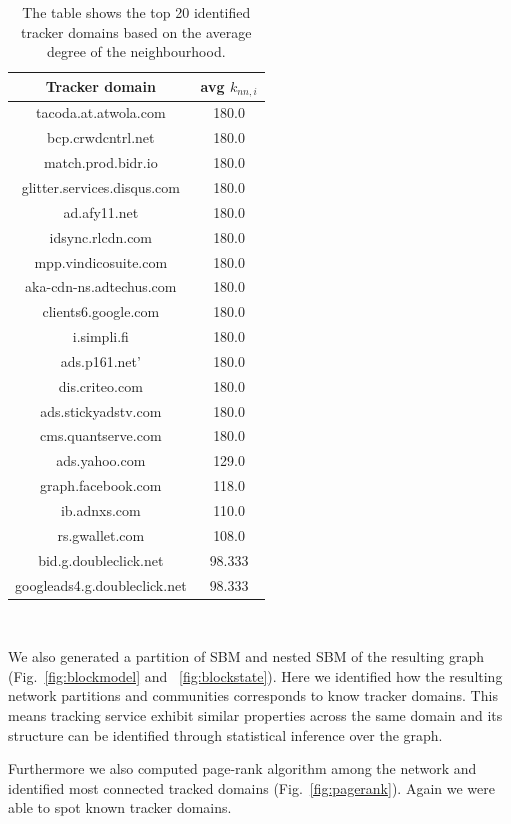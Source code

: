 \begin{table}[h!]
\centering
\begin{tabular}{ || c | c || }
\hline
Tracker domain & avg $k_{nn,i}$ \\
\hline
\hline
tacoda.at.atwola.com & 180.0 \\
bcp.crwdcntrl.net & 180.0 \\
match.prod.bidr.io & 180.0 \\
glitter.services.disqus.com & 180.0 \\
ad.afy11.net & 180.0 \\
idsync.rlcdn.com &180.0 \\
mpp.vindicosuite.com & 180.0 \\
aka-cdn-ns.adtechus.com & 180.0 \\
clients6.google.com & 180.0 \\
i.simpli.fi & 180.0 \\
ads.p161.net' & 180.0 \\
dis.criteo.com & 180.0 \\
ads.stickyadstv.com & 180.0 \\
cms.quantserve.com & 180.0 \\
ads.yahoo.com & 129.0 \\
graph.facebook.com & 118.0 \\
ib.adnxs.com & 110.0 \\
rs.gwallet.com & 108.0 \\
bid.g.doubleclick.net & 98.333\\
googleads4.g.doubleclick.net & 98.333\\
\hline
\end{tabular}
\\[2.5pt]
\caption{\label{table:trackers} The table shows the top 20 identified tracker domains based on the average degree of the neighbourhood.}
\end{table}

We also generated a partition of SBM and nested SBM of the resulting graph (Fig.~\ref{fig:blockmodel} and ~\ref{fig:blockstate}). Here we identified how the resulting network partitions and communities corresponds to know tracker domains. This means tracking service exhibit similar properties across the same domain and its structure can be identified through statistical inference over the graph.

Furthermore we also computed page-rank algorithm among the network and identified most connected tracked domains (Fig.~\ref{fig:pagerank}). Again we were able to spot known tracker domains.

